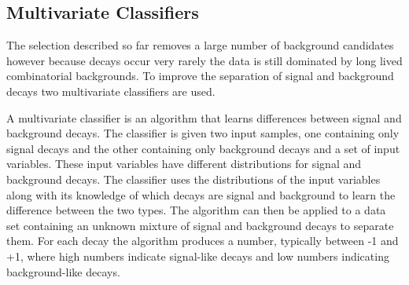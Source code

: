 



\subsection{Multivariate Classifiers}
\label{sec:MVC}

The selection described so far removes a large number of background candidates however because \bmumu decays occur very rarely the data is still dominated by long lived combinatorial backgrounds. To improve the separation of signal and background decays two multivariate classifiers are used.

A multivariate classifier is an algorithm that learns differences between signal and background decays. The classifier is given two input samples, one containing only signal decays and the other containing only background decays and a set of input variables. These input variables have different distributions for signal and background decays. The classifier uses the distributions of the input variables along with its knowledge of which decays are signal and background to learn the difference between the two types. The algorithm can then be applied to a data set containing an unknown mixture of signal and background decays to separate them. For each decay the algorithm produces a number, typically between -1 and +1, where high numbers indicate signal-like decays and low numbers indicating background-like decays. %

